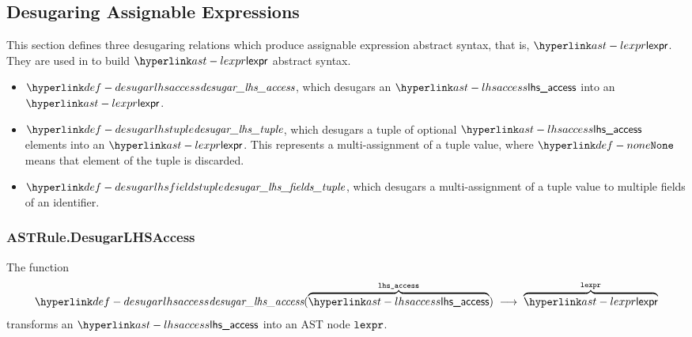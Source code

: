 \subsection{Desugaring Assignable Expressions\label{sec:AssignableExpressionsDesugaring}}

This section defines three desugaring relations which produce assignable expression abstract syntax, that is, $\lexpr$.
They are used in  to build $\lexpr$ abstract syntax.
\begin{itemize}
  \item $\desugarlhsaccess$, which desugars an $\lhsaccess$ into an $\lexpr$.
  \item $\desugarlhstuple$, which desugars a tuple of optional $\lhsaccess$ elements into an $\lexpr$.
    This represents a multi-assignment of a tuple value, where $\None$ means that element of the tuple is discarded.
  \item $\desugarlhsfieldstuple$, which desugars a multi-assignment of a tuple value to multiple fields of an identifier.
\end{itemize}

\subsubsection{ASTRule.DesugarLHSAccess \label{sec:ASTRule.DesugarLHSAccess}}
\hypertarget{def-desugarlhsaccess}{}
The function
\[
  \desugarlhsaccess(\overname{\lhsaccess}{\vlhsaccess}) \;\aslto\; \overname{\lexpr}{\vlexpr}
\]
transforms an $\lhsaccess$ into an AST node $\vlexpr$.

\begin{mathpar}
\end{mathpar}

